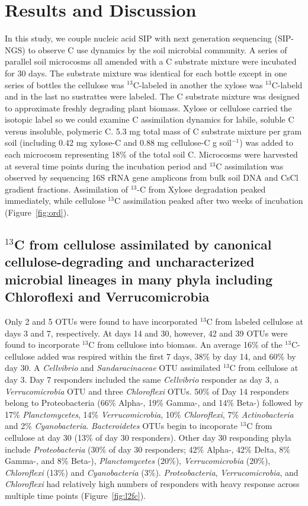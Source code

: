 \section{Results and Discussion}
In this study, we couple nucleic acid SIP with next generation sequencing
(SIP-NGS) to observe C use dynamics by the soil microbial community. A series
of parallel soil microcosms all amended with a C substrate mixture were
incubated for 30 days. The substrate mixture was identical for each bottle
except in one series of bottles the cellulose was $^{13}$C-labeled in another
the xylose was $^{13}$C-labeld and in the last no sustrattes were labeled. The
C substrate mixture was designed to approximate freshly degrading plant
biomass. Xylose or cellulose carried the isotopic label so we could examine C
assimilation dynamics for labile, soluble C versus insoluble, polymeric C. 5.3
mg total mass of C substrate mixture per gram soil (including 0.42 mg xylose-C
and 0.88 mg cellulose-C g soil$^{-1}$) was added to each microcosm representing
18\% of the total soil C. Microcosms were harvested at several time points
during the incubation period and $^{13}$C assimilation was observed by
sequencing 16S rRNA gene amplicons from bulk soil DNA and CsCl gradient
fractions. Assimilation of $^{13}$-C from Xylose degradation peaked immediately, 
while cellulose $^{13}$C assimilation peaked after two weeks of incubation
(Figure~\ref{fig:ord}).

\subsection{$^{13}$C from cellulose assimilated by canonical
cellulose-degrading and uncharacterized microbial lineages in many phyla
including Chloroflexi and Verrucomicrobia} 
Only 2 and 5 OTUs were found to have incorporated $^{13}$C from labeled
cellulose at days 3 and 7, respectively. At days 14 and 30, however, 42 and 39
OTUs were found to incorporate $^{13}$C from cellulose into biomass. An average
16\% of the $^{13}$C-cellulose added was respired within the first 7 days, 38\%
by day 14, and 60\% by day 30. A \textit{Cellvibrio} and
\textit{Sandaracinaceae} OTU assimilated $^{13}$C from cellulose at day 3. Day
7 responders included the same \textit{Cellvibrio} responder as day 3, a
\textit{Verrucomicrobia} OTU and three \textit{Chloroflexi} OTUs. 50\% of Day
14 responders belong to Proteobacteria (66\% Alpha-, 19\% Gamma-, and 14\%
Beta-) followed by 17\% \textit{Planctomycetes}, 14\% \textit{Verrucomicrobia},
10\% \textit{Chloroflexi}, 7\% \textit{Actinobacteria} and 2\%
\textit{Cyanobacteria}. \textit{Bacteroidetes} OTUs begin to incoporate
$^{13}$C from cellulose at day 30 (13\% of day 30 responders). Other day 30
responding phyla include \textit{Proteobacteria} (30\% of day 30 responders;
42\% Alpha-, 42\% Delta, 8\% Gamma-, and 8\% Beta-), \textit{Planctomycetes}
(20\%), \textit{Verrucomicrobia} (20\%), \textit{Chloroflexi} (13\%) and
\textit{Cyanobacteria} (3\%). \textit{Proteobacteria},
\textit{Verrucomicrobia}, and \textit{Chloroflexi} had relatively high numbers
of responders with heavy response across multiple time points (Figure~\ref{fig:l2fc}).

